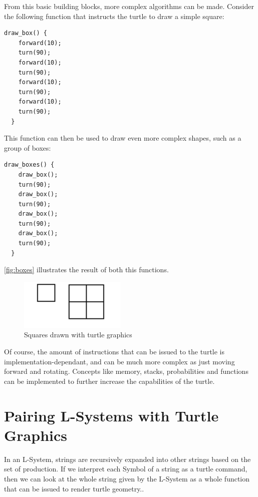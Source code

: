 \documentclass{acmtog}
\begin{document}
From this basic building blocks, more complex algorithms can be made. Consider the following function that instructs the turtle to draw a simple square:

\begin{lstlisting}[label={lst:square}]
  draw_box() {
    forward(10);
    turn(90);
    forward(10);
    turn(90);
    forward(10);
    turn(90);
    forward(10);
    turn(90); 
  }
\end{lstlisting}

This function can then be used to draw even more complex shapes, such as a group of boxes:

\begin{lstlisting}[caption={},label={lst:squares}]
  draw_boxes() {
    draw_box();
    turn(90);
    draw_box();
    turn(90);
    draw_box();
    turn(90);
    draw_box();
    turn(90);
  }
\end{lstlisting}

\autoref{fig:boxes} illustrates the result of both this functions.

\begin{figure}[!htp]
  \begin{center}
    \includegraphics{images/0_draw_box}
    \caption{Squares drawn with turtle graphics \label{fig:boxes}}
    \end{center}
\end{figure}

Of course, the amount of instructions that can be issued to the turtle is implementation-dependant, and can be much more complex as just moving forward and rotating. Concepts like memory, stacks, probabilities and functions can be implemented to further increase the capabilities of the turtle.

\section{Pairing L-Systems with Turtle Graphics}
\label{sec:pairing}

In an L-System, strings are recursively expanded into other strings based on the set of production. If we interpret each Symbol of a string as a turtle command, then we can look at the whole string given by the L-System as a whole function that can be issued to render turtle geometry..
\end{document}
